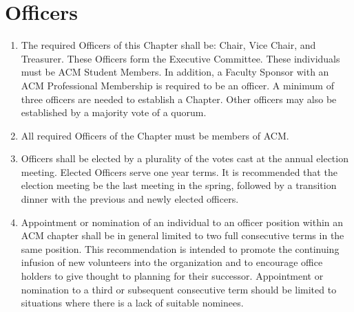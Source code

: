 \section{Officers}
\begin{enumerate}
	\item The required Officers of this Chapter shall be: Chair, Vice Chair, and Treasurer. These Officers form the Executive Committee. These individuals must be ACM Student Members. In addition, a Faculty Sponsor with an ACM Professional Membership is required to be an officer. A minimum of three officers are needed to establish a Chapter. Other officers may also be established by a majority vote of a quorum.
	\item All required Officers of the Chapter must be members of ACM.
	\item Officers shall be elected by a plurality of the votes cast at the annual election meeting. Elected Officers serve one year terms. It is recommended that the election meeting be the last meeting in the spring, followed by a transition dinner with the previous and newly elected officers.
	\item Appointment or nomination of an individual to an officer position within an ACM chapter shall be in general limited to two full consecutive terms in the same position.  This recommendation is intended to promote the continuing infusion of new volunteers into the organization and to encourage office holders to give thought to planning for their successor.  Appointment or nomination to a third or subsequent consecutive term should be limited to situations where there is a lack of suitable nominees.
\end{enumerate}

